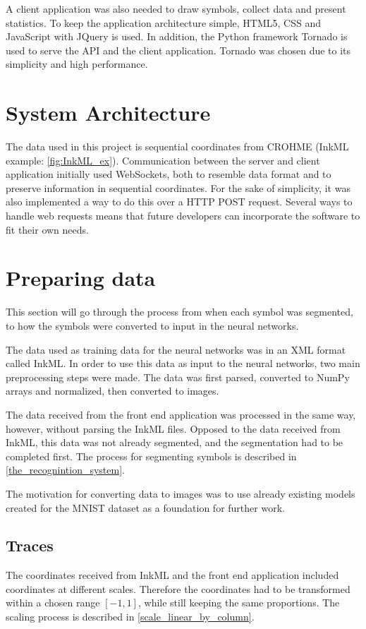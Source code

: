 A client application was also needed to draw symbols, collect data and present statistics. To keep the application architecture simple, HTML5, CSS and JavaScript with JQuery is used. In addition, the Python framework Tornado is used to serve the API and the client application. Tornado was chosen due to its simplicity and high performance.


\section{System Architecture}
The data used in this project is sequential coordinates from CROHME (InkML example: \ref{fig:InkML_ex}). Communication between the server and client application initially used WebSockets, both to resemble data format and to preserve information in sequential coordinates. For the sake of simplicity, it was also implemented a way to do this over a HTTP POST request. Several ways to handle web requests means that future developers can incorporate the software to fit their own needs.


\section{Preparing data}
This section will go through the process from when each symbol was segmented, to how the symbols were converted to input in the neural networks.

The data used as training data for the neural networks was in an XML format called InkML. In order to use this data as input to the neural networks, two main preprocessing steps were made. The data was first parsed, converted to NumPy arrays and normalized, then converted to images.

The data received from the front end application was processed in the same way, however, without parsing the InkML files. Opposed to the data received from InkML, this data was not already segmented, and the segmentation had to be completed first. The process for segmenting symbols is described in \ref{the_recognintion_system}.

The motivation for converting data to images was to use already existing models created for the MNIST dataset as a foundation for further work.

\subsection{Traces}
\label{preparing_data_traces}
The coordinates received from InkML and the front end application included coordinates at different scales. Therefore the coordinates had to be transformed within a chosen range $[-1, 1]$, while still keeping the same proportions. The scaling process is described in \ref{scale_linear_by_column}.

